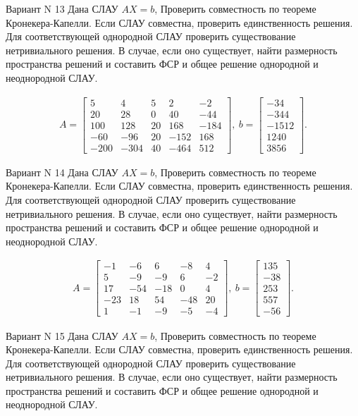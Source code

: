 \documentclass[11pt]{report}
\begin{document}
Вариант N 13
Дана СЛАУ $AX = b$,
Проверить совместность по теореме Кронекера-Капелли. Если СЛАУ совместна, проверить единственность решения.
Для соответствующей однородной СЛАУ проверить существование нетривиального решения. В случае, если оно существует,
найти размерность пространства решений и составить ФСР и общее решение однородной  и неоднородной СЛАУ.


\begin{align*}
 A = \left[\begin{matrix}5 & 4 & 5 & 2 & -2\\20 & 28 & 0 & 40 & -44\\100 & 128 & 20 & 168 & -184\\-60 & -96 & 20 & -152 & 168\\-200 & -304 & 40 & -464 & 512\end{matrix}\right],
\ b = \left[\begin{matrix}-34\\-344\\-1512\\1240\\3856\end{matrix}\right]. 
 \end{align*}

Вариант N 14
Дана СЛАУ $AX = b$,
Проверить совместность по теореме Кронекера-Капелли. Если СЛАУ совместна, проверить единственность решения.
Для соответствующей однородной СЛАУ проверить существование нетривиального решения. В случае, если оно существует,
найти размерность пространства решений и составить ФСР и общее решение однородной  и неоднородной СЛАУ.


\begin{align*}
 A = \left[\begin{matrix}-1 & -6 & 6 & -8 & 4\\5 & -9 & -9 & 6 & -2\\17 & -54 & -18 & 0 & 4\\-23 & 18 & 54 & -48 & 20\\1 & -1 & -9 & -5 & -4\end{matrix}\right],
\ b = \left[\begin{matrix}135\\-38\\253\\557\\-56\end{matrix}\right]. 
 \end{align*}

Вариант N 15
Дана СЛАУ $AX = b$,
Проверить совместность по теореме Кронекера-Капелли. Если СЛАУ совместна, проверить единственность решения.
Для соответствующей однородной СЛАУ проверить существование нетривиального решения. В случае, если оно существует,
найти размерность пространства решений и составить ФСР и общее решение однородной  и неоднородной СЛАУ.
\end{document}
